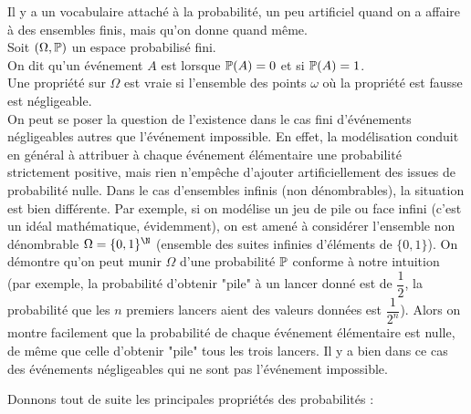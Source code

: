 \documentclass[12pt,a4paper]{report}
\begin{document}
\begin{remarque}{}
Il y a un vocabulaire attaché à la probabilité, un peu artificiel quand on a affaire à des ensembles finis, mais qu'on donne quand même. \\
Soit $(\Omega,\mathbb{P})$ un espace probabilisé fini. \\
On dit qu'un événement $A$ est  lorsque $\mathbb{P}(A) = 0$ et  si $\mathbb{P}(A) = 1$. \\
Une propriété sur $\Omega$ est vraie  si l'ensemble des points $\omega$ où la propriété est fausse est négligeable. \\

On peut se poser la question de l'existence dans le cas fini d'événements négligeables autres que l'événement impossible. En effet, la modélisation conduit en général
à attribuer à chaque événement élémentaire une probabilité strictement positive, mais rien n'empêche d'ajouter artificiellement des issues de probabilité nulle. Dans 
le cas d'ensembles infinis (non dénombrables), la situation est bien différente. Par exemple, si on modélise un jeu de pile ou face infini (c'est un idéal 
mathématique, évidemment), on est amené à considérer l'ensemble non dénombrable $\Omega = \{0,1\}^\N$ (ensemble des suites infinies d'éléments de $\{0,1\}$). On 
démontre qu'on peut munir $\Omega$ d'une probabilité $\mathbb{P}$ conforme à notre intuition (par exemple, la probabilité d'obtenir "pile" à un lancer donné est de $\dfrac{1}{2}$, 
la probabilité que les $n$ premiers lancers aient des valeurs données est $\dfrac{1}{2^n}$). Alors on montre facilement que la probabilité de chaque événement 
élémentaire est nulle, de même que celle d'obtenir "pile" tous les trois lancers. Il y a bien dans ce cas des événements négligeables qui ne sont pas l'événement 
impossible.

\end{remarque}

\pagebreak

Donnons tout de suite les principales propriétés des probabilités :
\end{document}
